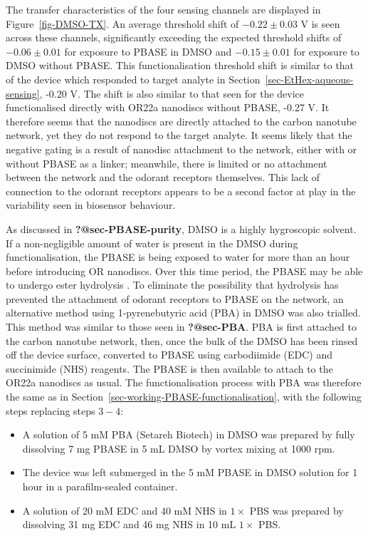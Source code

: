 \documentclass[
  a4paper,
]{scrbook}
\begin{document}
The transfer characteristics of the four sensing channels are displayed
in Figure~\ref{fig-DMSO-TX}. An average threshold shift of
\(-0.22\pm0.03\) V is seen across these channels, significantly
exceeding the expected threshold shifts of \(-0.06\pm0.01\) for exposure
to PBASE in DMSO and \(-0.15\pm0.01\) for exposure to DMSO without
PBASE. This functionalisation threshold shift is similar to that of the
device which responded to target analyte in
Section~\ref{sec-EtHex-aqueous-sensing}, -0.20 V. The shift is also
similar to that seen for the device functionalised directly with OR22a
nanodiscs without PBASE, -0.27 V. It therefore seems that the nanodiscs
are directly attached to the carbon nanotube network, yet they do not
respond to the target analyte. It seems likely that the negative gating
is a result of nanodisc attachment to the network, either with or
without PBASE as a linker; meanwhile, there is limited or no attachment
between the network and the odorant receptors themselves. This lack of
connection to the odorant receptors appears to be a second factor at
play in the variability seen in biosensor behaviour.

As discussed in \textbf{?@sec-PBASE-purity}, DMSO is a highly
hygroscopic solvent. If a non-negligible amount of water is present in
the DMSO during functionalisation, the PBASE is being exposed to water
for more than an hour before introducing OR nanodiscs. Over this time
period, the PBASE may be able to undergo ester hydrolysis
\autocite{Hermanson2013-3}. To eliminate the possibility that hydrolysis
has prevented the attachment of odorant receptors to PBASE on the
network, an alternative method using 1-pyrenebutyric acid (PBA) in DMSO
was also trialled. This method was similar to those seen in
\textbf{?@sec-PBA}. PBA is first attached to the carbon nanotube
network, then, once the bulk of the DMSO has been rinsed off the device
surface, converted to PBASE using carbodiimide (EDC) and succinimide
(NHS) reagents. The PBASE is then available to attach to the OR22a
nanodiscs as usual. The functionalisation process with PBA was therefore
the same as in Section~\ref{sec-working-PBASE-functionalisation}, with
the following steps replacing steps \(3-4\):

\begin{itemize}
\item
  A solution of 5 mM PBA (Setareh Biotech) in DMSO was prepared by fully
  dissolving 7 mg PBASE in 5 mL DMSO by vortex mixing at 1000 rpm.
\item
  The device was left submerged in the 5 mM PBASE in DMSO solution for 1
  hour in a parafilm-sealed container.
\item
  A solution of 20 mM EDC and 40 mM NHS in \(1 \times\) PBS was prepared
  by dissolving 31 mg EDC and 46 mg NHS in 10 mL \(1 \times\) PBS.
\end{itemize}
\end{document}
